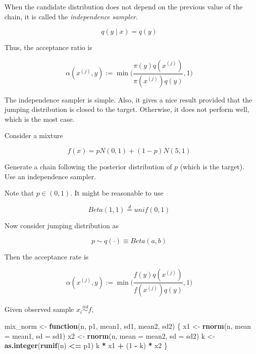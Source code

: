 \documentclass[]{book}
\newenvironment{Shaded}{\begin{snugshade}}{\end{snugshade}}
\newcommand{\ControlFlowTok}[1]{\textcolor[rgb]{0.13,0.29,0.53}{\textbf{#1}}}
\newcommand{\DataTypeTok}[1]{\textcolor[rgb]{0.13,0.29,0.53}{#1}}
\newcommand{\DecValTok}[1]{\textcolor[rgb]{0.00,0.00,0.81}{#1}}
\newcommand{\KeywordTok}[1]{\textcolor[rgb]{0.13,0.29,0.53}{\textbf{#1}}}
\newcommand{\NormalTok}[1]{#1}
\newcommand{\OperatorTok}[1]{\textcolor[rgb]{0.81,0.36,0.00}{\textbf{#1}}}
\newcommand{\StringTok}[1]{\textcolor[rgb]{0.31,0.60,0.02}{#1}}
\theoremstyle{definition}
\theoremstyle{definition}
\theoremstyle{definition}
\theoremstyle{remark}
\let\BeginKnitrBlock\begin \let\EndKnitrBlock\end
\begin{document}
When the candidate distribution does not depend on the previous value of the chain, it is called the \emph{independence sampler}.

\begin{equation}
  q(y \mid x) = q(y)
  \label{eq:indepjump}
\end{equation}

Thus, the acceptance ratio is

\begin{equation}
  \alpha(x^{(j)}, y) := \min \bigg(\frac{\pi(y) q(x^{(j)})}{\pi(x^{(j)}) q(y)}, 1 \bigg)
  \label{eq:indepacc}
\end{equation}

The independence sampler is simple. Also, it gives a nice result provided that the jumping distribution is closed to the target. Otherwise, it does not perform well, which is the most case.

\BeginKnitrBlock{example}[Independence sampler]
\protect\hypertarget{exm:indepmhmix}{}{\label{exm:indepmhmix} {} }Consider a mixture

\[f(x) = p N(0, 1) + (1 - p) N(5, 1)\]

Generate a chain following the posterior distribution of \(p\) (which is the target). Use an independence sampler.
\EndKnitrBlock{example}

Note that \(p \in (0, 1)\). It might be reasonable to use

\[Beta(1, 1) \stackrel{d}{=} unif(0, 1)\]

Now consider jumping distribution as

\[p \sim q(\cdot) \equiv Beta(a, b)\]

Then the acceptance rate is

\[\alpha(x^{(j)}, y) := \min \bigg(\frac{f(y) q(x^{(j)})}{f(x^{(j)}) q(y)}, 1 \bigg)\]

Given observed sample \(x_i \stackrel{iid}{\sim}f\),

\begin{Shaded}
\begin{Highlighting}[]
\NormalTok{mix_norm <-}\StringTok{ }\ControlFlowTok{function}\NormalTok{(n, p1, mean1, sd1, mean2, sd2) \{}
\NormalTok{  x1 <-}\StringTok{ }\KeywordTok{rnorm}\NormalTok{(n, }\DataTypeTok{mean =}\NormalTok{ mean1, }\DataTypeTok{sd =}\NormalTok{ sd1)}
\NormalTok{  x2 <-}\StringTok{ }\KeywordTok{rnorm}\NormalTok{(n, }\DataTypeTok{mean =}\NormalTok{ mean2, }\DataTypeTok{sd =}\NormalTok{ sd2)}
\NormalTok{  k <-}\StringTok{ }\KeywordTok{as.integer}\NormalTok{(}\KeywordTok{runif}\NormalTok{(n) }\OperatorTok{<=}\StringTok{ }\NormalTok{p1)}
\NormalTok{  k }\OperatorTok{*}\StringTok{ }\NormalTok{x1 }\OperatorTok{+}\StringTok{ }\NormalTok{(}\DecValTok{1} \OperatorTok{-}\StringTok{ }\NormalTok{k) }\OperatorTok{*}\StringTok{ }\NormalTok{x2}
\NormalTok{\}}
\end{Highlighting}
\end{Shaded}
\end{document}
